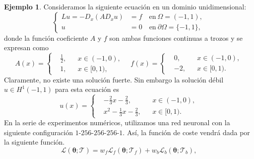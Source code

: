 \documentclass[a4paper,11pt,spanish, twoside, leqno]{tfg-uam}
\theoremstyle{definition}
\newtheorem{exmp}[teor]{Ejemplo}
\begin{document}
\begin{mdframed}
    \begin{exmp}\label{exmp:fallo}
        Consideramos la siguiente ecuación en un dominio unidimensional:
        \begin{equation}
            \left\{
            \begin{aligned}
                L u =-D_{x}(AD_{x} u) &=f\quad \text{en}\  \Omega=(-1,1), \\
                u &=0\quad \text{en}\  \partial\Omega=\{-1,1\},
            \end{aligned}
            \right.
        \end{equation}
        donde la función coeficiente $A$ y $f$ son ambas funciones continuas a trozos y se expresan como
        \begin{equation}\label{eq:1dCoeff}
            A(x)=\left\{
            \begin{aligned}
                & \tfrac{1}{2}, & & x\in (-1,0), \\
                &1, & & x\in [0,1),
            \end{aligned}
            \right.\quad 
            f(x)=\left\{
            \begin{aligned}
                & 0, & & x\in (-1,0), \\
                & -2, & & x\in [0,1).
            \end{aligned}
            \right.
        \end{equation}
        Claramente, no existe una solución fuerte. Sin embargo la solución débil $u\in H^1(-1,1)$ para esta ecuación es
        \begin{equation}\label{eq:SolTo1dEq}
            u(x)=
            \left\{
            \begin{aligned}
                & -\tfrac{2}{3}x-\tfrac{2}{3}, & & x\in (-1,0), \\
                & x^2-\tfrac{1}{3}x-\tfrac{2}{3}, & & x\in [0,1).
            \end{aligned}
            \right.
        \end{equation}
        En la serie de experimentos numéricos, utilizamos una red neuronal con la siguiente configuración $1$-$256$-$256$-$256$-$1$.  Así, la función de coste vendrá dada por la siguiente función.
        \begin{equation*} 
            \mathcal{L}(\boldsymbol{\theta}; \mathcal{T}) = w_f \mathcal{L}_f(\boldsymbol{\theta}; \mathcal{T}_f) + w_b \mathcal{L}_b(\boldsymbol{\theta}; \mathcal{T}_b),

\end{equation*}
\end{exmp}
\end{mdframed}
\end{document}
